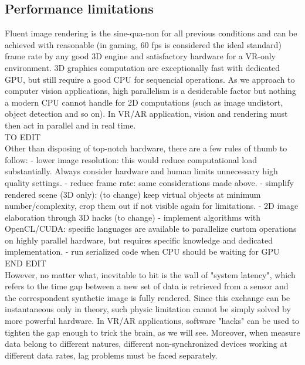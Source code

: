 \subsection{Performance limitations}
Fluent image rendering is the sine-qua-non for all previous conditions and can be achieved with reasonable (in gaming, 60 fps is considered the ideal standard) frame rate by any good 3D engine and satisfactory hardware for a VR-only environment. 3D graphics computation are exceptionally fast with dedicated GPU, but still require a good CPU for sequencial operations. As we approach to computer vision applications, high parallelism is a desiderable factor but nothing a modern CPU cannot handle for 2D computations (such as image undistort, object detection and so on). In VR/AR application, vision and rendering must then act in parallel and in real time.\\
TO EDIT\\
Other than disposing of top-notch hardware, there are a few rules of thumb to follow:
- lower image resolution: this would reduce computational load substantially. Always consider hardware and human limits unnecessary high quality settings.
- reduce frame rate: same considerations made above.
- simplify rendered scene (3D only): (to change) keep virtual objects at minimum number/complexity, crop them out if not visible again for limitations.
- 2D image elaboration through 3D hacks (to change)
- implement algorithms with OpenCL/CUDA: specific languages are available to parallelize custom operations on highly parallel hardware, but requires specific knowledge and dedicated implementation.
- run serialized code when CPU should be waiting for GPU\\
END EDIT\\
However, no matter what, inevitable to hit is the wall of "system latency", which refers to the time gap between a new set of data is retrieved from a sensor and the correspondent synthetic image is fully rendered. Since this exchange can be instantaneous only in theory, such physic limitation cannot be simply solved by more powerful hardware. In VR/AR applications, software "hacks" can be used to tighten the gap enough to trick the brain, as we will see. Moreover, when measure data belong to different natures, different non-synchronized devices working at different data rates, lag problems must be faced separately. 
